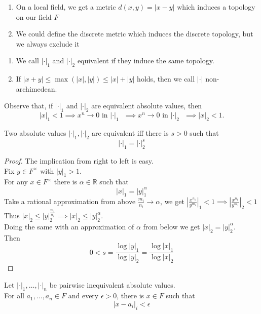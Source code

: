 \documentclass[../main.tex]{subfiles}
\begin{document}
\begin{rmq}
	\begin{enumerate}
	\item On a local field, we get a metric $d( x,y) = |x-y|$ which induces a topology on our field $F$ 
	\item We could define the discrete metric which induces the discrete topology, but we always exclude it
	\end{enumerate}
\end{rmq}
\begin{defn}
	\begin{enumerate}
	\item We call $|\cdot|_1$ and $ |\cdot|_2$ equivalent if they induce the same topology.
	\item If $|x+y| \leq \max( |x|,|y|) \leq |x| + |y|$ holds, then we call $|\cdot|$ non-archimedean.
	\end{enumerate}
\end{defn}
Observe that, if $|\cdot|_1$ and $|\cdot|_2$ are equivalent absolute values, then
\[ 
|x|_1 < 1 \implies x^{n}\to 0 \text{ in $|\cdot|_1$  } \implies x^{n}\to 0 \text{ in $|\cdot|_2$  } \implies |x|_2 <1.
\]
\begin{propo}
Two absolute values $|\cdot|_1, |\cdot|_2$ are equivalent iff there is $s>0$ such that
\[ 
|\cdot|_1 = |\cdot|_2^{s}	
\]

\end{propo}
\begin{proof}
The implication from right to left is easy.\\
Fix $y \in F^{\times}$ with $|y|_1>1$.\\
For any $x\in F^{\times}$ there is $\alpha\in \mathbb{R}$ such that
\[ 
|x|_1 = |y|_1^{\alpha}
\]
Take a rational approximation from above $ \frac{m_i}{n_i}\to \alpha$, we get $ | \frac{x^{n_1}}{y^{m_1}}|_1<1 \implies | \frac{x^{n_1}}{y^{m_1}}|_2<1$\\
Thus $|x|_2 \leq |y|_2^{ \frac{m_i}{n_i}}\implies |x|_2 \leq |y|_2^{\alpha}$.\\
Doing the same with an approximation of $\alpha$ from below we get $|x|_2 = |y|_2^{\alpha}$.\\
Then
\[ 
0<s= \frac{\log |y|_1}{\log |y|_2} = \frac{\log |x|_1}{\log |x|_2}
\]
\end{proof}
\begin{thm}
Let $|\cdot|_1,\ldots,|\cdot|_n$ be pairwise inequivalent absolute values.\\
For all $a_1,\ldots,a_n \in F$ and every $\epsilon>0$, there is $x\in F$ such that
\[ 
|x-a_i|_i <\epsilon
\]

\end{thm}
\end{document}
